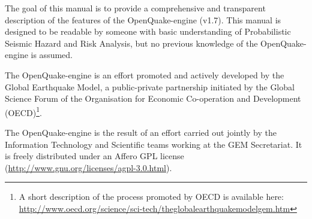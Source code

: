 The goal of this manual is to provide a comprehensive and transparent description of the features of the OpenQuake-engine (v1.7). This manual is designed to be readable by someone with basic understanding of Probabilistic Seismic Hazard and Risk Analysis, but no previous knowledge of the OpenQuake-engine is assumed.

The OpenQuake-engine is an effort promoted and actively developed by the Global Earthquake Model, a public-private partnership initiated by the Global Science Forum of the Organisation for Economic Co-operation and Development (OECD)\footnote{A short description of the process promoted by OECD is available here:\\\href{http://www.oecd.org/science/sci-tech/theglobalearthquakemodelgem.htm}{http://www.oecd.org/science/sci-tech/theglobalearthquakemodelgem.htm}}.

The OpenQuake-engine is the result of an effort carried out jointly by the Information Technology and Scientific teams working at the GEM Secretariat. It is freely distributed under an Affero GPL license (\href{http://www.gnu.org/licenses/agpl-3.0.html}{http://www.gnu.org/licenses/agpl-3.0.html}).
